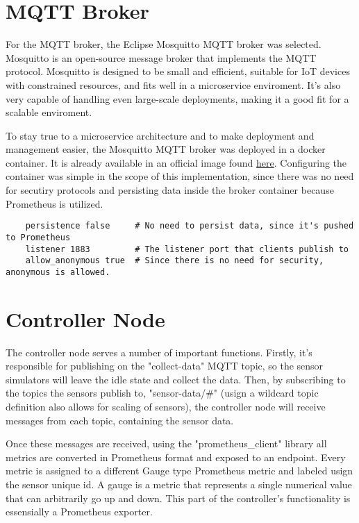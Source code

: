 \section{MQTT Broker}
For the MQTT broker, the Eclipse Mosquitto MQTT broker was selected. Mosquitto is an open-source message broker that implements the MQTT protocol. Mosquitto is designed to be small and efficient, suitable for IoT devices with constrained resources, and fits well in a microservice enviroment. It's also very capable of handling even large-scale deployments, making it a good fit for a scalable enviroment.

To stay true to a microservice architecture and to make deployment and management easier, the Mosquitto MQTT broker was deployed in a docker container. It is already available in an official image found \href{https://hub.docker.com/_/eclipse-mosquitto}{here}. Configuring the container was simple in the scope of this implementation, since there was no need for secutiry protocols and persisting data inside the broker container because Prometheus is utilized.

\begin{verbatim}
    persistence false     # No need to persist data, since it's pushed to Prometheus
    listener 1883         # The listener port that clients publish to
    allow_anonymous true  # Since there is no need for security, anonymous is allowed.
\end{verbatim}

\section{Controller Node}
The controller node serves a number of important functions. Firstly, it's responsible for publishing on the "collect-data" MQTT topic, so the sensor simulators will leave the idle state and collect the data. Then, by subscribing to the topics the sensors publish to, "sensor-data/\#" (usign a wildcard topic definition also allows for scaling of sensors), the controller node will receive messages from each topic, containing the sensor data.

Once these messages are received, using the "prometheus\_client" library all metrics are converted in Prometheus format and exposed to an endpoint. Every metric is assigned to a different Gauge type Prometheus metric and labeled usign the sensor unique id. A gauge is a metric that represents a single numerical value that can arbitrarily go up and down. This part of the controller's functionality is essensially a Prometheus exporter.


